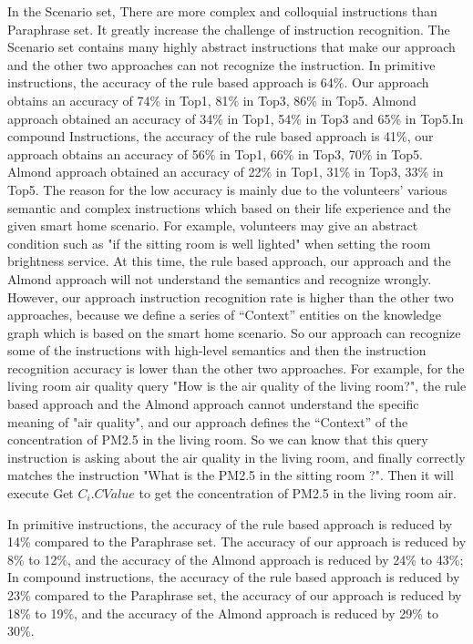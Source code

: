 In the Scenario set, There are more complex and colloquial instructions than Paraphrase set. It greatly increase the challenge of instruction recognition. The Scenario set contains many highly abstract instructions that make our approach and the other two approaches can not recognize the instruction. In primitive instructions, the accuracy of the rule based approach is 64\%. Our approach obtains an accuracy of 74\% in Top1, 81\% in Top3, 86\% in Top5. Almond approach obtained an accuracy of 34\% in Top1, 54\% in Top3 and 65\% in Top5.In compound Instructions, the accuracy of the rule based approach is 41\%, our approach obtains an accuracy of 56\% in Top1, 66\% in Top3, 70\% in Top5. Almond approach obtained an accuracy of 22\% in Top1, 31\% in Top3, 33\% in Top5. The reason for the low accuracy is mainly due to the volunteers' various semantic and complex instructions which based on their life experience and the given smart home scenario. For example, volunteers may give an abstract condition such as "if the sitting room is well lighted" when setting the room brightness service. At this time, the rule based approach, our approach and the Almond approach will not understand the semantics and recognize wrongly. However, our approach instruction recognition rate is higher than the other two approaches, because we define a series of “Context” entities on the knowledge graph which is based on the smart home scenario. So our approach can recognize some of the instructions with high-level semantics and then the instruction recognition accuracy is lower than the other two approaches. For example, for the living room air quality query "How is the air quality of the living room?", the rule based approach and the Almond approach cannot understand the specific meaning of "air quality", and our approach defines the “Context” of the concentration of PM2.5 in the living room. So we can know that this query instruction is asking about the air quality in the living room, and finally correctly matches the instruction "What is the PM2.5 in the sitting room ?". Then it will execute Get $C_i.CValue$ to get the concentration of PM2.5 in the living room air. 

In primitive instructions, the accuracy of the rule based approach is reduced by 14\% compared to the Paraphrase set. The accuracy of our approach is reduced by 8\% to 12\%, and the accuracy of the Almond approach is reduced by 24\% to 43\%; In compound instructions, the accuracy of the rule based approach is reduced by 23\% compared to the Paraphrase set, the accuracy of our approach is reduced by 18\% to 19\%, and the accuracy of the Almond approach is reduced by 29\% to 30\%.

